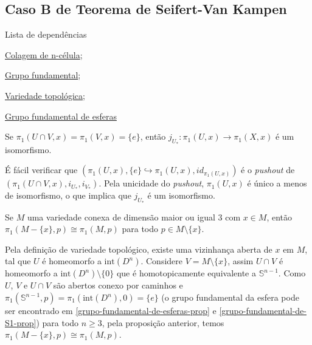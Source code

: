 \subsection{Caso B de Teorema de Seifert-Van Kampen} %
\label{teorema-s-vk-caso-b-prop}
\begin{titlemize}{Lista de dependências}
    \item \hyperref[colagem-de-n-celula-def]{Colagem de n-célula};\\
    \item \hyperref[grupo-fundamental]{Grupo fundamental};\\
    \item \hyperref[variedade-def]{Variedade topológica};\\
    \item \hyperref[grupo-fundamental-de-esferas-prop]{Grupo fundamental de esferas}
\end{titlemize}
\begin{prop}
    Se $\pi_1(U\cap V,x)=\pi_1(V,x)=\{e\}$, então $j_{U_*}:\pi_1(U,x)\rightarrow \pi_1(X,x)$ é um isomorfismo.
\end{prop}
\begin{dem}
    É fácil verificar que $(\pi_1(U,x),\{e\}\hookrightarrow \pi_1(U,x), id_{\pi_1(U,x)})$ é o \emph{pushout} de $(\pi_1(U\cap V,x),i_{U_*},i_{V_*})$. Pela unicidade do \emph{pushout}, $\pi_1(U,x)$ é único a menos de isomorfismo, o que implica que $j_{U_*}$ é um isomorfismo.
\end{dem}

\begin{corol}
    Se $M$ uma variedade conexa de dimensão maior ou igual $3$ com $x\in M$, então $\pi_1(M-\{x\},p)\cong\pi_1(M,p)$ para todo $p\in M\setminus\{x\}$.
\end{corol}
\begin{dem}
Pela definição de variedade topológico, existe uma vizinhança aberta de $x$ em $M$, tal que $U$ é homeomorfo a $\text{int} (D^n)$. Considere $V=M\setminus\{x\}$, assim $U\cap V$ é homeomorfo a $\text{int}(D^n)\setminus \{0\}$ que é homotopicamente equivalente a $\mathbb{S}^{n-1}$. Como $U$, $V$ e $U\cap V$ são abertos conexo por caminhos e $\pi_1(\mathbb{S}^{n-1},p)=\pi_1(\text{int}(D^n),0)=\{e\}$ (o grupo fundamental da esfera pode ser encontrado em \ref{grupo-fundamental-de-esferas-prop} e \ref{grupo-fundamental-de-S1-prop}) para todo $n\ge 3$, pela proposição anterior, temos $\pi_1(M-\{x\},p)\cong\pi_1(M,p)$.
\end{dem}


